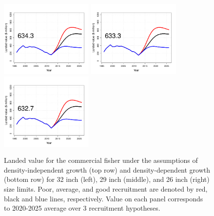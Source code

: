 \begin{figure}[htbp]
		\includegraphics[height=1.5in]{../FIGURES/SIZELIMIT/fig_32_DD_LVal.pdf}
		\includegraphics[height=1.5in]{../FIGURES/SIZELIMIT/fig_29_DD_LVal.pdf}
		\includegraphics[height=1.5in]{../FIGURES/SIZELIMIT/fig_26_DD_LVal.pdf}
	\caption{Landed value for the commercial fisher under the assumptions of density-independent growth (top row) and density-dependent growth (bottom row) for 32 inch (left), 29 inch (middle), and 26 inch (right) size limits.  Poor, average, and good recruitment are denoted by red, black and blue lines, respectively.  Value on each panel corresponds to 2020-2025 average over 3 recruitment hypotheses.}
	\label{fig:FIGURES_SIZELIMIT_fig_32_DI_LVal}
\end{figure}

